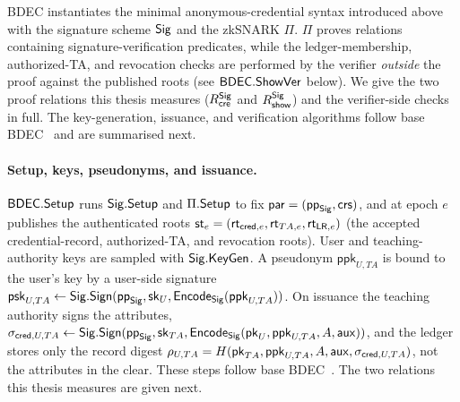 \begin{construction}
BDEC instantiates the minimal anonymous-credential syntax introduced above with the signature scheme $\mathsf{Sig}$ and the zkSNARK $\Pi$. $\Pi$ proves relations containing signature-verification predicates, while the ledger-membership, authorized-TA, and revocation checks are performed by the verifier \emph{outside} the proof against the published roots (see $\mathsf{BDEC}.\mathsf{ShowVer}$ below). We give the two proof relations this thesis measures ($R_{\mathsf{cre}}^{\mathsf{Sig}}$ and $R_{\mathsf{show}}^{\mathsf{Sig}}$) and the verifier-side checks in full. The key-generation, issuance, and verification algorithms follow base BDEC~\cite{10.1007/978-981-96-0957-4_3} and are summarised next.

\paragraph{Setup, keys, pseudonyms, and issuance.}
$\mathsf{BDEC}.\mathsf{Setup}$ runs $\mathsf{Sig}.\mathsf{Setup}$ and $\Pi.\mathsf{Setup}$ to fix $\mathsf{par}=(\mathsf{pp}_{\mathsf{Sig}},\mathsf{crs})$, and at epoch $e$ publishes the authenticated roots $\mathsf{st}_e=(\mathsf{rt}_{\mathsf{cred},e},\mathsf{rt}_{TA,e},\mathsf{rt}_{\mathsf{LR},e})$ (the accepted credential-record, authorized-TA, and revocation roots). User and teaching-authority keys are sampled with $\mathsf{Sig}.\mathsf{KeyGen}$. A pseudonym $\mathsf{ppk}_{U,TA}$ is bound to the user's key by a user-side signature $\mathsf{psk}_{U,TA}\leftarrow\mathsf{Sig}.\mathsf{Sign}(\mathsf{pp}_{\mathsf{Sig}},\mathsf{sk}_U,\mathsf{Encode}_{\mathsf{Sig}}(\mathsf{ppk}_{U,TA}))$. On issuance the teaching authority signs the attributes, $\sigma_{\mathsf{cred},U,TA}\leftarrow\mathsf{Sig}.\mathsf{Sign}(\mathsf{pp}_{\mathsf{Sig}},\mathsf{sk}_{TA},\mathsf{Encode}_{\mathsf{Sig}}(\mathsf{pk}_U,\mathsf{ppk}_{U,TA},A,\mathsf{aux}))$, and the ledger stores only the record digest $\rho_{U,TA}=H(\mathsf{pk}_{TA},\mathsf{ppk}_{U,TA},A,\mathsf{aux},\sigma_{\mathsf{cred},U,TA})$, not the attributes in the clear. These steps follow base BDEC~\cite{10.1007/978-981-96-0957-4_3}. The two relations this thesis measures are given next.


\end{construction}
